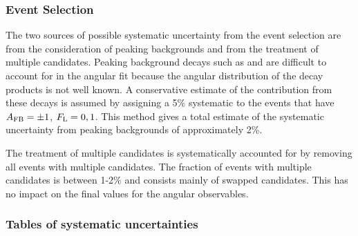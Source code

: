 \subsubsection{Event Selection}

The two sources of possible systematic uncertainty from the event selection are from the 
consideration of peaking backgrounds and from the treatment of multiple candidates.
Peaking background decays such as \Bs\to\Kstarz\mumu and \Bs\to\varphi\mumu are difficult to account
for in the angular fit because the angular distribution of the decay products is not well known.
A conservative estimate of the contribution from these decays is assumed by assigning a
5\% systematic to the events that have $A_{\mathrm{FB}}=\pm1$, $F_{\mathrm{L}}=0,1$.
This method gives a total estimate of the systematic uncertainty from peaking backgrounds of approximately 2\%.

The treatment of multiple candidates is systematically accounted for by removing all events with multiple 
candidates.
The fraction of events with multiple candidates is between 1-2\% and consists mainly of \ktopi swapped candidates.
This has no impact on the final values for the angular observables.

\subsubsection{Tables of systematic uncertainties}


